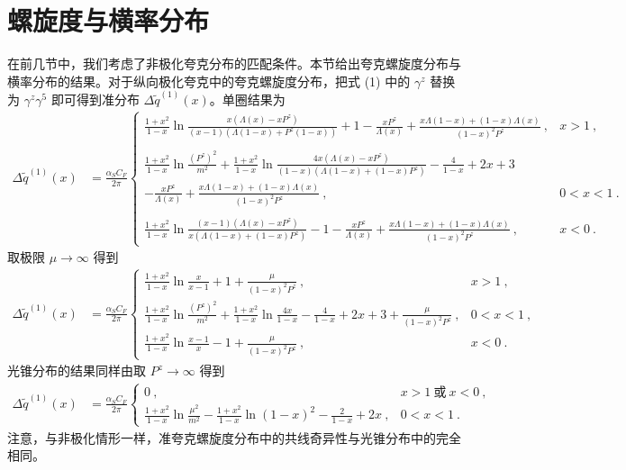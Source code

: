 \section{螺旋度与横率分布}
在前几节中，我们考虑了非极化夸克分布的匹配条件。本节给出夸克螺旋度分布与横率分布的结果。对于纵向极化夸克中的夸克螺旋度分布，把式 (1) 中的 $\gamma^z$ 替换为 $\gamma^z\gamma^5$ 即可得到准分布 $\Delta \tilde q^{(1)}(x)$。单圈结果为
\begin{align}\label{helivertexnoexp}
\Delta \tilde q^{(1)}(x)&=\frac{\alpha_S C_F}{2\pi} \left\{ \begin{array} {ll} \frac{1+x^2}{1-x}\ln \frac{x(\Lambda(x)-x P^z)}{(x-1)(\Lambda(1-x)+P^z(1-x))}+1-\frac{x P^z}{\Lambda(x)}+\frac{x\Lambda(1-x)+(1-x)\Lambda(x)}{(1-x)^2 P^z}\ , & x>1\ , \\
\ \\
\frac{1+x^2}{1-x}\ln\frac{(P^z)^2}{m^2}+\frac{1+x^2}{1-x}\ln \frac{4x(\Lambda(x)-x P^z)}{(1-x)(\Lambda(1-x)+(1-x)P^z)}-\frac{4}{1-x}+2x+3\ & \\
-\frac{x P^z}{\Lambda(x)}+\frac{x\Lambda(1-x)+(1-x)\Lambda(x)}{(1-x)^2 P^z}\ , & 0<x<1\ . \\
\ \\
\frac{1+x^2}{1-x}\ln \frac{(x-1)(\Lambda(x)-x P^z)}{x(\Lambda(1-x)+(1-x)P^z)}-1-\frac{x P^z}{\Lambda(x)}+\frac{x\Lambda(1-x)+(1-x)\Lambda(x)}{(1-x)^2P^z}\ , & x<0\ . \end{array} \right.
\end{align}
取极限 $\mu\rightarrow \infty$ 得到
\begin{align}\label{helivertexLgmu}
\Delta \tilde q^{(1)}(x)&=\frac{\alpha_S C_F}{2\pi} \left\{ \begin{array} {ll} \frac{1+x^2}{1-x}\ln \frac{x}{x-1}+1+\frac{\mu}{(1-x)^2P^z}\ , & x>1\ , \\ \frac{1+x^2}{1-x}\ln \frac{(P^z)^2}{m^2}+\frac{1+x^2}{1-x}\ln\frac{4x}{1-x}-\frac{4}{1-x}+2x+3+\frac{\mu}{(1-x)^2P^z}\ , & 0<x<1\ , \\ \frac{1+x^2}{1-x}\ln \frac{x-1}{x}-1+\frac{\mu}{(1-x)^2P^z}\ , & x<0\ . \end{array} \right.
\end{align}
光锥分布的结果同样由取 $P^z\to\infty$ 得到
\begin{align}\label{helivertexIMF}
\Delta \tilde q^{(1)}(x)&=\frac{\alpha_S C_F}{2\pi} \left\{ \begin{array} {ll} 0\ , & x>1\  \mbox{或}\  x<0\ , \\ \frac{1+x^2}{1-x}\ln \frac{\mu^2}{m^2}-\frac{1+x^2}{1-x}\ln{(1-x)^2}-\frac{2}{1-x}+2x\ , & 0<x<1\ .\end{array} \right.
\end{align}
注意，与非极化情形一样，准夸克螺旋度分布中的共线奇异性与光锥分布中的完全相同。


